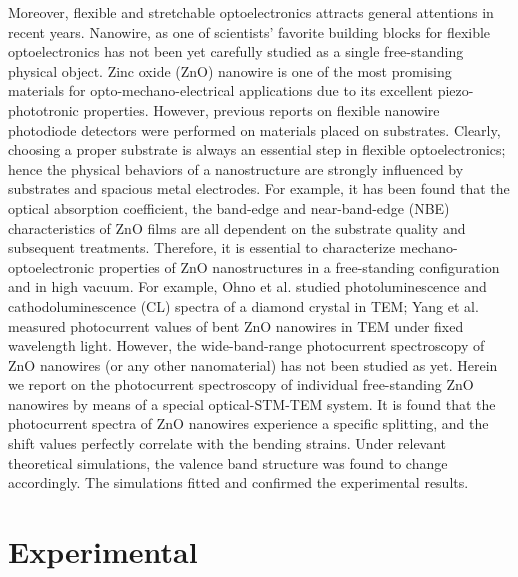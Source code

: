 Moreover, flexible and stretchable optoelectronics attracts general attentions in recent years. Nanowire, as one of scientists’ favorite building blocks for flexible optoelectronics has not been yet carefully studied as a single free-standing physical object. Zinc oxide (ZnO) nanowire is one of the most promising materials for opto-mechano-electrical applications due to its excellent piezo-phototronic properties.\cite{L.2011a,L.2010,D.2015,L.2010a} However, previous reports on flexible nanowire photodiode detectors were performed on materials placed on substrates.\cite{G.2015,H.2014,G.2014} Clearly, choosing a proper substrate is always an essential step in flexible optoelectronics; hence the physical behaviors of a nanostructure are strongly influenced by substrates and spacious metal electrodes. For example, it has been found that the optical absorption coefficient, the band-edge and near-band-edge (NBE) characteristics of ZnO films are all dependent on the substrate quality and subsequent treatments.\cite{R.1997} Therefore, it is essential to characterize mechano-optoelectronic properties of ZnO nanostructures in a free-standing configuration and in high vacuum. For example, Ohno et al. studied photoluminescence and cathodoluminescence (CL) spectra of a diamond crystal in TEM;\cite{S.1995} Yang et al. measured photocurrent values of bent ZnO nanowires in TEM under fixed wavelength light.\cite{E.2012} However, the wide-band-range photocurrent spectroscopy of ZnO nanowires (or any other nanomaterial) has not been studied as yet. 
Herein we report on the photocurrent spectroscopy of individual free-standing ZnO nanowires by means of a special optical-STM-TEM system. It is found that the photocurrent spectra of ZnO nanowires experience a specific splitting, and the shift values perfectly correlate with the bending strains. Under relevant theoretical simulations, the valence band structure was found to change accordingly. The simulations fitted and confirmed the experimental results. 

\section{Experimental}

